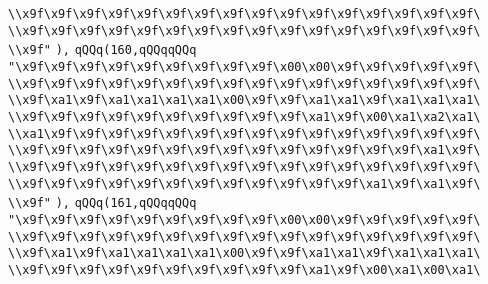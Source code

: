 \verb|\\x9f\x9f\x9f\x9f\x9f\x9f\x9f\x9f\x9f\x9f\x9f\x9f\x9f\x9f\x9f\x9f\|\newline
\verb|\\x9f\x9f\x9f\x9f\x9f\x9f\x9f\x9f\x9f\x9f\x9f\x9f\x9f\x9f\x9f\x9f\|\newline
\verb|\\x9f"|\newline
\verb|),|\newline
\verb|qQQq(160,qQQqqQQq|\newline
\verb|"\x9f\x9f\x9f\x9f\x9f\x9f\x9f\x9f\x9f\x00\x00\x9f\x9f\x9f\x9f\x9f\|\newline
\verb|\\x9f\x9f\x9f\x9f\x9f\x9f\x9f\x9f\x9f\x9f\x9f\x9f\x9f\x9f\x9f\x9f\|\newline
\verb|\\x9f\xa1\x9f\xa1\xa1\xa1\xa1\x00\x9f\x9f\xa1\xa1\x9f\xa1\xa1\xa1\|\newline
\verb|\\x9f\x9f\x9f\x9f\x9f\x9f\x9f\x9f\x9f\x9f\xa1\x9f\x00\xa1\xa2\xa1\|\newline
\verb|\\xa1\x9f\x9f\x9f\x9f\x9f\x9f\x9f\x9f\x9f\x9f\x9f\x9f\x9f\x9f\x9f\|\newline
\verb|\\x9f\x9f\x9f\x9f\x9f\x9f\x9f\x9f\x9f\x9f\x9f\x9f\x9f\x9f\xa1\x9f\|\newline
\verb|\\x9f\x9f\x9f\x9f\x9f\x9f\x9f\x9f\x9f\x9f\x9f\x9f\x9f\x9f\x9f\x9f\|\newline
\verb|\\x9f\x9f\x9f\x9f\x9f\x9f\x9f\x9f\x9f\x9f\x9f\x9f\xa1\x9f\xa1\x9f\|\newline
\verb|\\x9f"|\newline
\verb|),|\newline
\verb|qQQq(161,qQQqqQQq|\newline
\verb|"\x9f\x9f\x9f\x9f\x9f\x9f\x9f\x9f\x9f\x00\x00\x9f\x9f\x9f\x9f\x9f\|\newline
\verb|\\x9f\x9f\x9f\x9f\x9f\x9f\x9f\x9f\x9f\x9f\x9f\x9f\x9f\x9f\x9f\x9f\|\newline
\verb|\\x9f\xa1\x9f\xa1\xa1\xa1\xa1\x00\x9f\x9f\xa1\xa1\x9f\xa1\xa1\xa1\|\newline
\verb|\\x9f\x9f\x9f\x9f\x9f\x9f\x9f\x9f\x9f\x9f\xa1\x9f\x00\xa1\x00\xa1\|\newline

